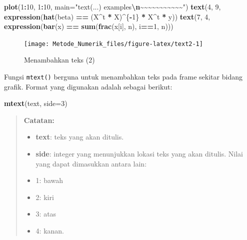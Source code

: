 \documentclass[
]{book}
\newenvironment{Shaded}{\begin{snugshade}}{\end{snugshade}}
\newcommand{\AttributeTok}[1]{\textcolor[rgb]{0.13,0.29,0.53}{#1}}
\newcommand{\DecValTok}[1]{\textcolor[rgb]{0.00,0.00,0.81}{#1}}
\newcommand{\FunctionTok}[1]{\textcolor[rgb]{0.13,0.29,0.53}{\textbf{#1}}}
\newcommand{\NormalTok}[1]{#1}
\newcommand{\SpecialCharTok}[1]{\textcolor[rgb]{0.81,0.36,0.00}{\textbf{#1}}}
\newcommand{\StringTok}[1]{\textcolor[rgb]{0.31,0.60,0.02}{#1}}
\providecommand{\tightlist}{%
  \setlength{\itemsep}{0pt}\setlength{\parskip}{0pt}}
\theoremstyle{definition}
\theoremstyle{definition}
\theoremstyle{definition}
\theoremstyle{definition}
\theoremstyle{remark}
\begin{document}
\begin{Shaded}
\begin{Highlighting}[]
\FunctionTok{plot}\NormalTok{(}\DecValTok{1}\SpecialCharTok{:}\DecValTok{10}\NormalTok{, }\DecValTok{1}\SpecialCharTok{:}\DecValTok{10}\NormalTok{, }
     \AttributeTok{main=}\StringTok{"text(...) examples}\SpecialCharTok{\textbackslash{}n}\StringTok{\textasciitilde{}\textasciitilde{}\textasciitilde{}\textasciitilde{}\textasciitilde{}\textasciitilde{}\textasciitilde{}\textasciitilde{}\textasciitilde{}\textasciitilde{}\textasciitilde{}"}\NormalTok{)}
\FunctionTok{text}\NormalTok{(}\DecValTok{4}\NormalTok{, }\DecValTok{9}\NormalTok{, }\FunctionTok{expression}\NormalTok{(}\FunctionTok{hat}\NormalTok{(beta) }\SpecialCharTok{==}\NormalTok{ (X}\SpecialCharTok{\^{}}\NormalTok{t }\SpecialCharTok{*}\NormalTok{ X)}\SpecialCharTok{\^{}}\NormalTok{\{}\SpecialCharTok{{-}}\DecValTok{1}\NormalTok{\} }\SpecialCharTok{*}\NormalTok{ X}\SpecialCharTok{\^{}}\NormalTok{t }\SpecialCharTok{*}\NormalTok{ y))}
\FunctionTok{text}\NormalTok{(}\DecValTok{7}\NormalTok{, }\DecValTok{4}\NormalTok{, }\FunctionTok{expression}\NormalTok{(}\FunctionTok{bar}\NormalTok{(x) }\SpecialCharTok{==} \FunctionTok{sum}\NormalTok{(}\FunctionTok{frac}\NormalTok{(x[i], n), i}\SpecialCharTok{==}\DecValTok{1}\NormalTok{, n)))}
\end{Highlighting}
\end{Shaded}

\begin{figure}

{\centering \texttt{[image: Metode\_Numerik\_files/figure-latex/text2-1]} 

}

\caption{Menambahkan teks (2)}\label{fig:text2}
\end{figure}

Fungsi \texttt{mtext()} berguna untuk menambahkan teks pada frame sekitar bidang grafik. Format yang digunakan adalah sebagai berikut:

\begin{Shaded}
\begin{Highlighting}[]
\FunctionTok{mtext}\NormalTok{(text, }\AttributeTok{side=}\DecValTok{3}\NormalTok{)}
\end{Highlighting}
\end{Shaded}

\begin{quote}
\textbf{Catatan:}

\begin{itemize}
\tightlist
\item
  \textbf{text}: teks yang akan ditulis.
\item
  \textbf{side}: integer yang menunjukkan lokasi teks yang akan ditulis. Nilai yang dapat dimasukkan antara lain:
\item
  1: bawah
\item
  2: kiri
\item
  3: atas
\item
  4: kanan.
\end{itemize}
\end{quote}
\end{document}

